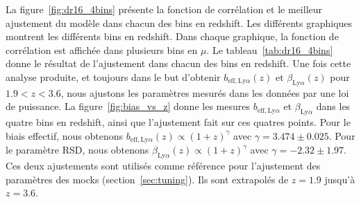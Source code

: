 \documentclass[11pt, twoside, a4paper, openright]{report}
\begin{document}
La figure~\ref{fig:dr16_4bins} présente la fonction de corrélation et le meilleur ajustement du modèle dans chacun des bins en redshift. Les différents graphiques montrent les différents bins en redshift. Dans chaque graphique, la fonction de corrélation est affichée dans plusieurs bins en $\mu$. Le tableau~\ref{tab:dr16_4bins} donne le résultat de l'ajustement dans chacun des bins en redshift.
Une fois cette analyse produite, et toujours dans le but d'obtenir $b_{\mathrm{eff},\mathrm{Ly}\alpha}(z)$ et $\beta_{\mathrm{Ly}\alpha}(z)$ pour $\num{1.9} < z  < \num{3.6}$, nous ajustons les paramètres \lya{} mesurés dans les données par une loi de puissance. La figure~\ref{fig:bias_vs_z} donne les mesures $b_{\mathrm{eff},\mathrm{Ly}\alpha}$ et $\beta_{\mathrm{Ly}\alpha}$ dans les quatre bins en redshift, ainsi que l'ajustement fait sur ces quatres points. Pour le biais effectif, nous obtenons $b_{\mathrm{eff},\mathrm{Ly}\alpha}(z) \propto (1+z)^{\gamma}$ avec $\gamma = \num{3.474} \pm \num{0.025}$. Pour le paramètre RSD, nous obtenons $\beta_{\mathrm{Ly}\alpha}(z) \propto (1+z)^{\gamma}$ avec $\gamma = - \num{2.32} \pm \num{1.97}$. Ces deux ajustements sont utilisés comme référence pour l'ajustement des paramètres des mocks (section~\ref{sec:tuning}). Ils sont extrapolés de $z = \num{1.9}$ jusqu'à $z = \num{3.6}$.
\end{document}
